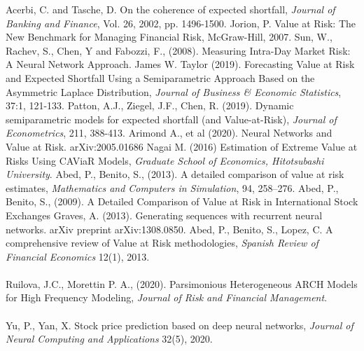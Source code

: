 \documentclass[a4paper,11pt,oneside]{book}
\begin{document}



Acerbi, C. and Tasche, D. On the coherence of expected shortfall, \textit{Journal of Banking and Finance}, Vol. 26, 2002,
pp. 1496-1500.\newline\newline
Jorion, P. Value at Risk: The New Benchmark for Managing Financial Risk, McGraw-Hill, 2007.\newline\newline
Sun, W., Rachev, S., Chen, Y and Fabozzi, F., (2008). Measuring Intra-Day Market
Risk: A Neural Network Approach.\newline\newline
James W. Taylor (2019). Forecasting Value at Risk and Expected Shortfall
Using a Semiparametric Approach Based on the Asymmetric Laplace Distribution, \textit{Journal of
Business \& Economic Statistics}, 37:1, 121-133.\newline\newline
Patton, A.J., Ziegel, J.F., Chen, R. (2019). Dynamic semiparametric models for expected shortfall
(and Value-at-Risk), \textit{Journal of Econometrics}, 211, 388-413.\newline\newline
Arimond A., et al (2020). Neural Networks and Value at Risk. 	arXiv:2005.01686\newline\newline
Nagai M. (2016) Estimation of Extreme Value at Risks Using CAViaR Models, \textit{Graduate School of Economics, Hitotsubashi University}.\newline\newline
Abed, P., Benito, S., (2013). A detailed comparison of value at risk estimates, \textit{Mathematics and Computers in Simulation}, 94, 258–276.\newline\newline
Abed, P., Benito, S., (2009). A Detailed Comparison of Value at Risk in International Stock Exchanges\newline\newline
Graves, A. (2013). Generating sequences with recurrent neural networks. arXiv preprint arXiv:1308.0850.\newline\newline
Abed, P., Benito, S., Lopez, C. A comprehensive review of Value at Risk methodologies, \textit{Spanish Review of Financial Economics} 12(1), 2013. \\\\
Ruilova, J.C., Morettin P. A., (2020). Parsimonious Heterogeneous ARCH Models for High
Frequency Modeling, \textit{Journal of Risk and Financial Management}.\\\\
Yu, P., Yan, X. Stock price prediction based on deep neural networks, \textit{Journal of Neural Computing and Applications} 32(5), 2020.






\listoffigures
\listoftables


\end{document}

